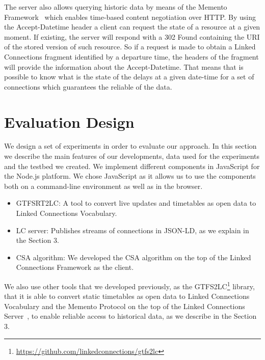 \documentclass[sw]{iosart2x}
\begin{document}
The server also allows querying historic data by means of the Memento Framework~\cite{van2010http} which enables time-based content negotiation over HTTP. By using the Accept-Datetime header a client can request the state of a resource at a given moment. If existing, the server will respond with a 302 Found containing the URI of the stored version of such resource. So if a request is made to obtain a Linked Connections fragment identified by a departure time, the headers of the fragment will provide the information about the Accept-Datetime. That means that is possible to know what is the state of the delays at a given date-time for a set of connections which guarantees the reliable of the data.


\section{Evaluation Design}

We design a set of experiments in order to evaluate our approach. In this section we describe the main features of our developments, data used for the experiments and the testbed we created.
We implement different components in JavaScript for the Node.js platform. We chose JavaScript as it allows us to use the components both on a command-line environment as well as in the browser.
\begin{itemize}
\item GTFSRT2LC: A tool to convert live updates and timetables as open data to Linked Connections Vocabulary.
\item LC server: Publishes streams of connections in JSON-LD, as we explain in the Section 3.
\item CSA algorithm: We developed the CSA algorithm on the top of the Linked Connections Framework as the client.
\end{itemize}

We also use other tools that we developed previously, as the GTFS2LC\footnote{\url{https://github.com/linkedconnections/gtfs2lc}} library, that it is able to convert static timetables as open data to Linked Connections Vocabulary and the Memento Protocol on the top of the Linked Connections Server~\cite{rojas2017providing}, to enable reliable access to historical data, as we describe in the Section 3.
\end{document}
